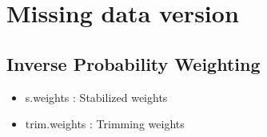 \documentclass[
]{book}
\providecommand{\tightlist}{%
  \setlength{\itemsep}{0pt}\setlength{\parskip}{0pt}}
\begin{document}
\hypertarget{missing-data-version-1}{%
\section{Missing data version}\label{missing-data-version-1}}

\hypertarget{inverse-probability-weighting-1}{%
\subsection{Inverse Probability Weighting}\label{inverse-probability-weighting-1}}

\begin{itemize}
\tightlist
\item
  s.weights : Stabilized weights\\
\item
  trim.weights : Trimming weights
\end{itemize}
\end{document}
